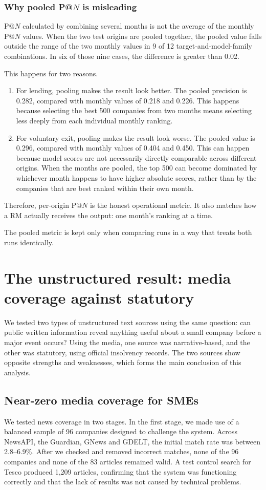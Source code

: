 \documentclass[    author={Samuel Menon Demelo; Sneha Saphala Ram Prasad; 
Viktor Ander Lindholm; Vishal Khatri},
               supervisor={Prof. Fernando Moreno-Pino},
                   degree={MSc},
                    title={Lloyds Commercial Banking Intelligence},
                 subtitle={Ranking SME Lending, Risk and Growth Prospects for Lloyds Banking Group},
                     type={},
                     year={2026}]{dissertation}
\begin{document}
\subsubsection{Why pooled P@$N$ is misleading}
P@$N$ calculated by combining several months is not the average of the monthly P@$N$ values. When the two test origins are pooled together, the pooled value falls outside the range of the two monthly values in 9 of 12 target-and-model-family combinations. In six of those nine cases, the difference is greater than 0.02.

This happens for two reasons.
\begin{enumerate}
    \item For lending, pooling makes the result look better. The pooled precision is 0.282, compared with monthly values of 0.218 and 0.226. This happens because selecting the best 500 companies from two months means selecting less deeply from each individual monthly ranking.
    \item For voluntary exit, pooling makes the result look worse. The pooled value is 0.296, compared with monthly values of 0.404 and 0.450. This can happen because model scores are not necessarily directly comparable across different origins. When the months are pooled, the top 500 can become dominated by whichever month happens to have higher absolute scores, rather than by the companies that are best ranked within their own month.
\end{enumerate}

Therefore, per-origin P@$N$ is the honest operational metric. It also matches how a RM actually receives the output: one month's ranking at a time.

The pooled metric is kept only when comparing runs in a way that treats both runs identically.

\section{The unstructured result: media coverage against statutory}
\label{sec:unstructured}
We tested two types of unstructured text sources using the same question: can public written information reveal anything useful about a small company before a major event occurs? Using the media, one source was narrative-based, and the other was statutory, using official insolvency records. The two sources show opposite strengths and weaknesses, which forms the main conclusion of this analysis.

\subsection{Near-zero media coverage for SMEs}
\label{sec:unstructured-media}
We tested news coverage in two stages. In the first stage, we made use of a balanced sample of 96 companies designed to challenge the system. Across NewsAPI, the Guardian, GNews and GDELT, the initial match rate was between 2.8--6.9\%. After we checked and removed incorrect matches, none of the 96 companies and none of the 83 articles remained valid. A test control search for Tesco produced 1,209 articles, confirming that the system was functioning correctly and that the lack of results was not caused by technical problems.
\end{document}
